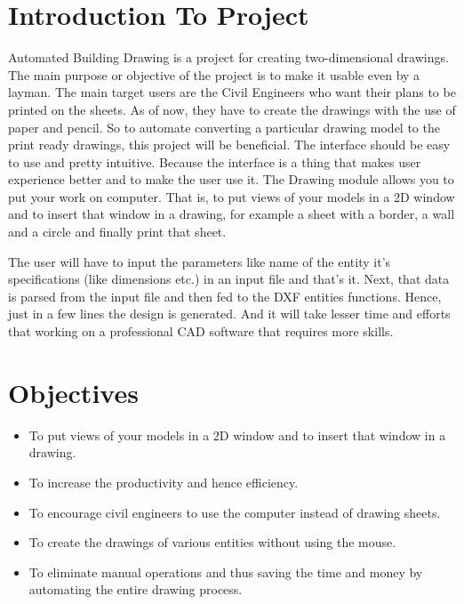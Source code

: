 \section{Introduction To Project} 
Automated Building Drawing is a project for creating two-dimensional drawings. The main purpose or objective of the project is to make it usable even by a layman. The main target users are the Civil Engineers who want their plans to be printed on the sheets. As of now, they have to create the drawings with the use of paper and pencil. So to automate converting a particular drawing model to the print ready drawings, this project will be beneficial. The interface should be easy
to use and pretty intuitive. Because the interface is a thing that makes user experience better and to make the user use it.
The Drawing module allows you to put your work on computer. That is, to put views of your models in a 2D window and to insert that window in a drawing, for example a sheet with a border, a wall and a circle and finally print that sheet.

The user will have to input the parameters like name of the entity it's specifications (like dimensions etc.) in an input file and that's it. Next, that data is parsed from the input file and then fed to the DXF entities functions. Hence, just in a few lines the design is generated. And it will take lesser time and efforts that working on a professional CAD software that requires more skills.


\section{Objectives}
\begin{itemize}
	\item To put views of your models in a 2D window and to insert that window in a drawing.
	\item To increase the productivity and hence efficiency.
	\item To encourage civil engineers to use the computer instead of drawing sheets.
	\item To create the drawings of various entities without using the mouse.
	\item To eliminate manual operations and thus saving the time and money by automating the entire drawing process.
\end{itemize}




